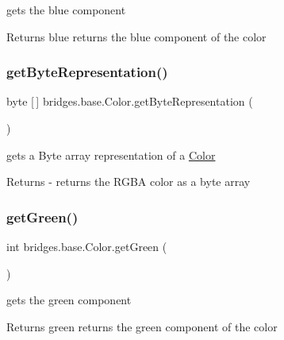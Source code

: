 gets the blue component

\begin{DoxyReturn}{Returns}
blue returns the blue component of the color 
\end{DoxyReturn}
\mbox{\label{classbridges_1_1base_1_1_color_a07215c888a6d17374a3d862ff30d5f93}} 
\subsubsection{\texorpdfstring{get\+Byte\+Representation()}{getByteRepresentation()}}
{\footnotesize\ttfamily byte \mbox{[}$\,$\mbox{]} bridges.\+base.\+Color.\+get\+Byte\+Representation (\begin{DoxyParamCaption}{ }\end{DoxyParamCaption})}

gets a Byte array representation of a \hyperlink{classbridges_1_1base_1_1_color}{Color}

\begin{DoxyReturn}{Returns}
-\/ returns the R\+G\+BA color as a byte array 
\end{DoxyReturn}
\mbox{\label{classbridges_1_1base_1_1_color_a8f3fdd23cf785704faa2e3701e25978f}} 
\subsubsection{\texorpdfstring{get\+Green()}{getGreen()}}
{\footnotesize\ttfamily int bridges.\+base.\+Color.\+get\+Green (\begin{DoxyParamCaption}{ }\end{DoxyParamCaption})}

gets the green component

\begin{DoxyReturn}{Returns}
green returns the green component of the color 
\end{DoxyReturn}
\mbox{\label{classbridges_1_1base_1_1_color_aced9bc89248b85686ba5385472974fe6}} 
